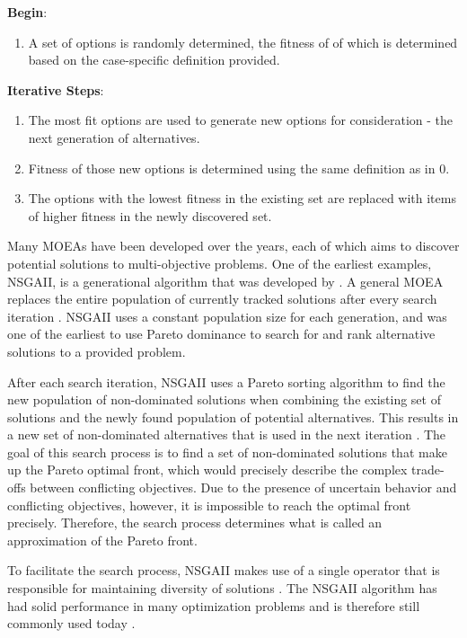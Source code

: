 \indent\textbf{Begin}: 
\begin{enumerate}[start=0]
    \item A set of options is randomly determined, the fitness of of which is determined based on the case-specific definition provided.
\end{enumerate}

\indent\textbf{Iterative Steps}: 
\begin{enumerate}[start=1]
    \item The most fit options are used to generate new options for consideration - the next generation of alternatives. 
    \item Fitness of those new options is determined using the same definition as in 0. 
    \item The options with the lowest fitness in the existing set are replaced with items of higher fitness in the newly discovered set. 
\end{enumerate}

Many MOEAs have been developed over the years, each of which aims to discover potential solutions to multi-objective problems. One of the earliest examples, NSGAII, is a generational algorithm that was developed by \citet{Deb2002}. A general MOEA replaces the entire population of currently tracked solutions after every search iteration \citep{Reed2013}. NSGAII uses a constant population size for each generation, and was one of the earliest to use Pareto dominance to search for and rank alternative solutions to a provided problem. 

After each search iteration, NSGAII uses a Pareto sorting algorithm to find the new population of non-dominated solutions when combining the existing set of solutions and the newly found population of potential alternatives. This results in a new set of non-dominated alternatives that is used in the next iteration \citep{Reed2013}. The goal of this search process is to find a set of non-dominated solutions that make up the Pareto optimal front, which would precisely describe the complex trade-offs between conflicting objectives. Due to the presence of uncertain behavior and conflicting objectives, however, it is impossible to reach the optimal front precisely. Therefore, the search process determines what is called an approximation of the Pareto front.  

To facilitate the search process, NSGAII makes use of a single operator that is responsible for maintaining diversity of solutions \citep{Reed2013, Ward2015}. The NSGAII algorithm has had solid performance in many optimization problems and is therefore still commonly used today \citep{Zheng2016}. 

